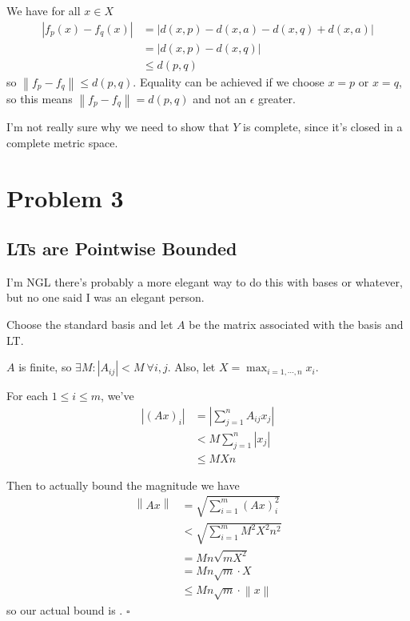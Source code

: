 \documentclass[12pt]{article}
\newcommand{\norm}[1]{\left\lVert#1\right\rVert}
\begin{document}
We have for all $x \in X$
\begin{align*}
  |f_p(x) - f_q(x)|
   & = |d(x, p) - d(x, a) - d(x, q) + d(x, a)| \\
   & = |d(x, p) - d(x, q)|                     \\
   & \le d(p, q)
\end{align*}
so $\norm{f_p-f_q} \le d(p, q)$.
Equality can be achieved if we choose $x=p$ or $x=q$,
so this means $\norm{f_p-f_q} = d(p, q)$ and not an $\epsilon$ greater.

I'm not really sure why we need to show that $Y$ is complete,
since it's closed in a complete metric space.

\pagebreak

\section{Problem 3}

\subsection{LTs are Pointwise Bounded}

I'm NGL there's probably a more elegant way to do this with bases or whatever,
but no one said I was an elegant person.

Choose the standard basis and let $A$ be the matrix associated with the basis and LT.

$A$ is finite, so $\exists M: |A_{ij}| < M\ \forall i, j$.
Also, let $X=\max_{i=1, \cdots, n} x_i$.

For each $1 \le i \le m$, we've
\begin{align*}
  |(Ax)_i|
   & = \left|\sum_{j=1}^{n} A_{ij}x_j\right| \\
   & < M\sum_{j=1}^{n} |x_j|                 \\
   & \le MXn
\end{align*}

Then to actually bound the magnitude we have
\begin{align*}
  \norm{Ax}
   & = \sqrt{\sum_{i=1}^{m} (Ax)_i^2}  \\
   & < \sqrt{\sum_{i=1}^{m} M^2X^2n^2} \\
   & = Mn\sqrt{mX^2}                   \\
   & = Mn\sqrt{m} \cdot X              \\
   & \le Mn\sqrt{m} \cdot \norm{x}
\end{align*}
so our actual bound is . $\square$
\end{document}
